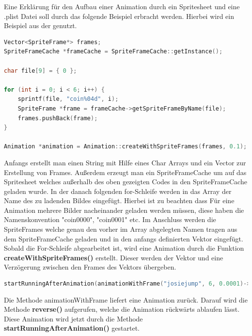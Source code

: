 Eine Erklärung für den Aufbau einer Animation durch ein Spritesheet und eine .plist Datei soll durch das folgende Beispiel erbracht werden. Hierbei wird ein Beispiel aus der  genutzt. 

\begin{lstlisting}[label=lst:build_josie_animation,
				   language=C++,
				   firstnumber=96,
				   caption=Sequence erstellen ( LevelPlayer.cpp )]
Vector<SpriteFrame*> frames;
SpriteFrameCache *frameCache = SpriteFrameCache::getInstance();

char file[9] = { 0 };

for (int i = 0; i < 6; i++) {
	sprintf(file, "coin%04d", i);
	SpriteFrame *frame = frameCache->getSpriteFrameByName(file);
	frames.pushBack(frame);
}

Animation *animation = Animation::createWithSpriteFrames(frames, 0.1);
\end{lstlisting}

Anfangs erstellt man einen String mit Hilfe eines Char Arrays und ein Vector zur Erstellung von Frames. Außerdem erzeugt man ein SpriteFrameCache um auf das Spritesheet welches außerhalb des oben gezeigten Codes in den SpriteFrameCache geladen wurde. In der danach folgenden for-Schleife werden
in das Array der Name des zu ladenden Bildes eingefügt. Hierbei ist zu beachten dass Für eine Animation mehrere Bilder nacheinander geladen werden müssen, diese haben die Namenskonvention "coin0000", "coin0001" etc. Im Anschluss werden die SpriteFrames welche genau den vorher im Array abgelegten Namen tragen aus dem SpriteFrameCache geladen und in den anfangs definierten Vektor eingefügt. 
Sobald die For-Schleife abgearbeitet ist, wird eine Animation durch die Funktion \textbf{createWithSpriteFrames()} erstellt. Dieser werden der Vektor und eine Verzögerung zwischen den Frames des Vektors übergeben.

\begin{lstlisting}[label=lst:build_josie_animation_reverse,
				   language=C++,
				   firstnumber=96,
				   caption=Sequence reverse ( LevelPlayer.cpp )]
startRunningAfterAnimation(animationWithFrame("josiejump", 6, 0.0001)->reverse())
\end{lstlisting}

Die Methode animationWithFrame liefert eine Animation zurück. Darauf wird die Methode \textbf{reverse()} aufgerufen, welche die Animation rückwärts ablaufen lässt. Diese Animation wird jetzt durch die Methode \textbf{startRunningAfterAnimation()} gestartet. 

